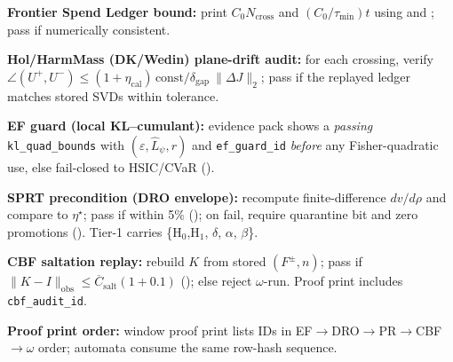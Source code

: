 \begin{acceptchecks}
\item \textbf{Frontier Spend Ledger bound:}
print $C_0 N_{\text{cross}}$ and $(C_0/\tau_{\min})t$ using
\jsgiLem{\lblJacobiDefect} and \jsgiLem{\lblNoZeno}; pass if numerically consistent.
\item \textbf{Hol/HarmMass (DK/Wedin) plane-drift audit:}
for each crossing, verify $\angle(U^+,U^-)\le (1+\eta_{\mathrm{cal}})\,\text{const}/\delta_{\text{gap}}\ \|\Delta J\|_2$; pass if the replayed ledger matches stored SVDs within tolerance.
\item \textbf{EF guard (local KL–cumulant):}
evidence pack shows a \emph{passing} \texttt{kl\_quad\_bounds} with $(\varepsilon,\hat L_\psi,r)$ and \texttt{ef\_guard\_id} \emph{before} any Fisher-quadratic use, else fail-closed to HSIC/CVaR (\jsgiiThm{\lblEFradius}).
\item \textbf{SPRT precondition (DRO envelope):}
recompute finite-difference $dv/d\rho$ and compare to $\eta^\star$; pass if within 5\% (\jsgiiThm{\lblDROenv}); on fail, require quarantine bit and zero promotions (\jsgiiDef{\lblQuarantine}). Tier-1 carries \{H$_0$,H$_1$, $\delta$, $\alpha$, $\beta$\}.
\item \textbf{CBF saltation replay:}
rebuild $K$ from stored $(F^\pm,n)$; pass if $\|K-I\|_{\text{obs}}\le \overline C_{\text{salt}}(1+0.1)$ (\jsgiiLem{\lblSaltation}); else reject $\omega$-run. Proof print includes \texttt{cbf\_audit\_id}.
\item \textbf{Proof print order:} window proof print lists IDs in EF$\rightarrow$DRO$\rightarrow$PR$\rightarrow$CBF$\rightarrow\omega$ order; automata consume the same row-hash sequence.
\end{acceptchecks}
